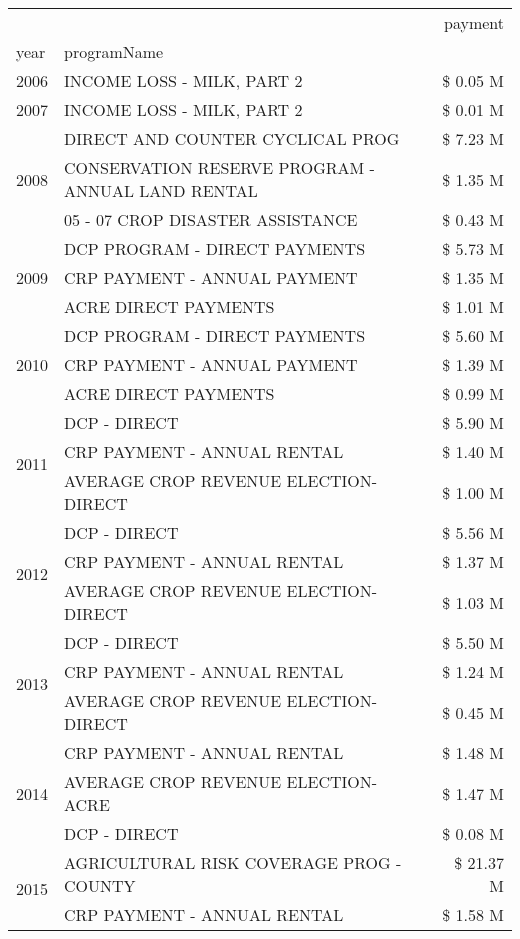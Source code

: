 \begin{tabular}{llr}
\toprule
 &  & payment \\
year & programName &  \\
\midrule
2006 & INCOME LOSS - MILK, PART 2 & \$ 0.05 M \\
\cline{1-3}
2007 & INCOME LOSS - MILK, PART 2 & \$ 0.01 M \\
\cline{1-3}
\multirow[t]{3}{*}{2008} & DIRECT AND COUNTER CYCLICAL PROG & \$ 7.23 M \\
 & CONSERVATION RESERVE PROGRAM - ANNUAL LAND RENTAL & \$ 1.35 M \\
 & 05 - 07 CROP DISASTER ASSISTANCE & \$ 0.43 M \\
\cline{1-3}
\multirow[t]{3}{*}{2009} & DCP PROGRAM - DIRECT PAYMENTS & \$ 5.73 M \\
 & CRP PAYMENT - ANNUAL PAYMENT & \$ 1.35 M \\
 & ACRE DIRECT PAYMENTS & \$ 1.01 M \\
\cline{1-3}
\multirow[t]{3}{*}{2010} & DCP PROGRAM - DIRECT PAYMENTS & \$ 5.60 M \\
 & CRP PAYMENT - ANNUAL PAYMENT & \$ 1.39 M \\
 & ACRE DIRECT PAYMENTS & \$ 0.99 M \\
\cline{1-3}
\multirow[t]{3}{*}{2011} & DCP - DIRECT & \$ 5.90 M \\
 & CRP PAYMENT - ANNUAL RENTAL & \$ 1.40 M \\
 & AVERAGE CROP REVENUE ELECTION-DIRECT & \$ 1.00 M \\
\cline{1-3}
\multirow[t]{3}{*}{2012} & DCP - DIRECT & \$ 5.56 M \\
 & CRP PAYMENT - ANNUAL RENTAL & \$ 1.37 M \\
 & AVERAGE CROP REVENUE ELECTION-DIRECT & \$ 1.03 M \\
\cline{1-3}
\multirow[t]{3}{*}{2013} & DCP - DIRECT & \$ 5.50 M \\
 & CRP PAYMENT - ANNUAL RENTAL & \$ 1.24 M \\
 & AVERAGE CROP REVENUE ELECTION-DIRECT & \$ 0.45 M \\
\cline{1-3}
\multirow[t]{3}{*}{2014} & CRP PAYMENT - ANNUAL RENTAL & \$ 1.48 M \\
 & AVERAGE CROP REVENUE ELECTION-ACRE & \$ 1.47 M \\
 & DCP - DIRECT & \$ 0.08 M \\
\cline{1-3}
\multirow[t]{3}{*}{2015} & AGRICULTURAL RISK COVERAGE PROG - COUNTY & \$ 21.37 M \\
 & CRP PAYMENT - ANNUAL RENTAL & \$ 1.58 M \\

\end{tabular}
